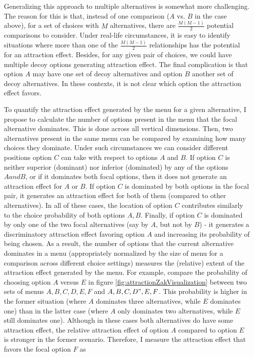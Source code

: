 \documentclass[a4paper,12pt]{article}
\begin{document}
Generalizing this approach to multiple alternatives is somewhat more challenging. The reason for this is that, instead of one comparison ($A$ vs. $B$ in the case above), for a set of choices with $M$ alternatives, there are $\frac{M(M-1)}{2}$ potential comparisons to consider. Under real-life circumstances, it is easy to identify situations where more than one of the $\frac{M(M-1)}{2}$ relationships has the potential for an attraction effect. Besides, for any given pair of choices, we could have multiple decoy options generating attraction effect. The final complication is that option $A$ may have one set of decoy alternatives and option $B$ another set of decoy alternatives. In these contexts, it is not clear which option the attraction effect favors.

To quantify the attraction effect generated by the menu for a given alternative, I propose to calculate the number of options present in the menu that the focal alternative dominates. This is done across all vertical dimensions. Then, two alternatives present in the same menu can be compared by examining how many choices they dominate. Under such circumstances we can consider different positions option $C$ can take with respect to options $A$ and $B$. If option $C$ is neither superior (dominant) nor inferior (dominated) by any of the options ${A and B}$, or if it dominates both focal options, then it does not generate an attraction effect for $A$ or $B$. If option $C$ is dominated by both options in the focal pair, it generates an attraction effect for both of them (compared to other alternatives). In all of these cases, the location of option $C$ contributes similarly to the choice probability of both options ${A, B}$.  Finally, if option $C$ is dominated by only one of the two focal alternatives (say by $A$, but not by $B$) - it generates a discriminatory attraction effect favoring option $A$ and increasing its probability of being chosen. As a result, the number of options that the current alternative dominates in a menu (appropriately normalized by the size of menu for a comparison across different choice settings) measures the (relative) extent of the attraction effect generated by the menu. For example, compare the probability of choosing option $A$ versus $E$ in figure \ref{fig:attractionZakVisualization} between two sets of menus ${A, B, C, D, E, F}$ and ${A, B, C, D", E, F}$. This probability is higher in the former situation (where $A$ dominates three alternatives, while $E$ dominates one) than in the latter case (where $A$ only dominates two alternatives, while $E$ still dominates one). Although in these cases both alternatives do have some attraction effect, the relative attraction effect of option $A$ compared to option $E$ is stronger in the former scenario.  Therefore, I measure the attraction effect that favors the focal option $F$ as
\end{document}
